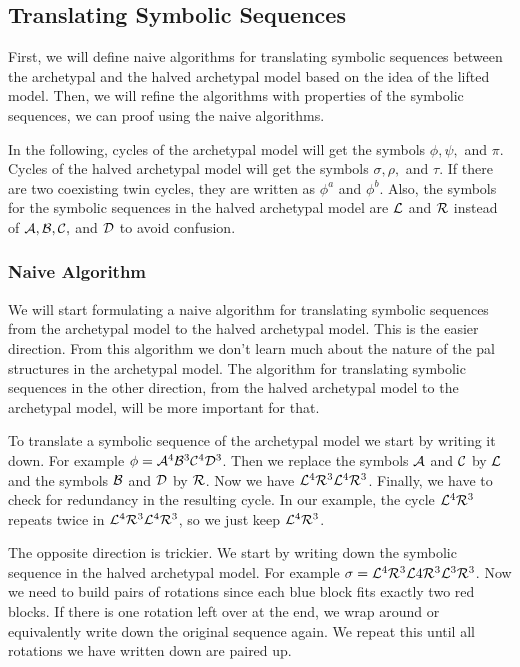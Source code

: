\subsection{Translating Symbolic Sequences}
\label{sec:add.halved.tanslating}

First, we will define naive algorithms for translating symbolic sequences between the archetypal and the halved archetypal model based on the idea of the lifted model.
Then, we will refine the algorithms with properties of the symbolic sequences, we can proof using the naive algorithms.

In the following, cycles of the archetypal model will get the symbols $\phi, \psi,$ and $\pi$.
Cycles of the halved archetypal model will get the symbols $\sigma, \rho,$ and $\tau$.
If there are two coexisting twin cycles, they are written as $\phi^a$ and $\phi^b$.
Also, the symbols for the symbolic sequences in the halved archetypal model are $\mathcal{L}$ and $\mathcal{R}$ instead of $\mathcal{A}, \mathcal{B}, \mathcal{C},$ and $\mathcal{D}$ to avoid confusion.

\subsubsection{Naive Algorithm}

We will start formulating a naive algorithm for translating symbolic sequences from the archetypal model to the halved archetypal model.
This is the easier direction.
From this algorithm we don't learn much about the nature of the \gls{pal} structures in the archetypal model.
The algorithm for translating symbolic sequences in the other direction, from the halved archetypal model to the archetypal model, will be more important for that.

To translate a symbolic sequence of the archetypal model we start by writing it down.
For example $\phi = \mathcal{A}^4\mathcal{B}^3\mathcal{C}^4\mathcal{D}^3$.
Then we replace the symbols $\mathcal{A}$ and $\mathcal{C}$ by $\mathcal{L}$ and the symbols $\mathcal{B}$ and $\mathcal{D}$ by $\mathcal{R}$.
Now we have $\mathcal{L}^4\mathcal{R}^3\mathcal{L}^4\mathcal{R}^3$.
Finally, we have to check for redundancy in the resulting cycle.
In our example, the cycle $\mathcal{L}^4\mathcal{R}^3$ repeats twice in $\mathcal{L}^4\mathcal{R}^3\mathcal{L}^4\mathcal{R}^3$, so we just keep $\mathcal{L}^4\mathcal{R}^3$.

The opposite direction is trickier.
We start by writing down the symbolic sequence in the halved archetypal model.
For example $\sigma = \mathcal{L}^4\mathcal{R}^3\mathcal{L}4\mathcal{R}^3\mathcal{L}^3\mathcal{R}^3$.
Now we need to build pairs of rotations since each blue block fits exactly two red blocks.
If there is one rotation left over at the end, we wrap around or equivalently write down the original sequence again.
We repeat this until all rotations we have written down are paired up.

